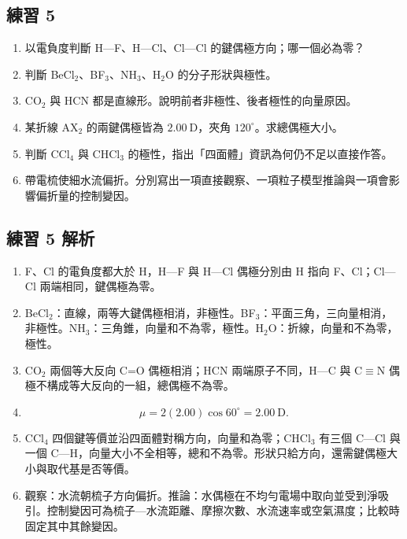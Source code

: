 \documentclass[11pt,a4paper]{article}
\providecommand{\tightlist}{%
  \setlength{\itemsep}{0pt}\setlength{\parskip}{0pt}}
\begin{document}
\subsection{練習 5}\label{ux7df4ux7fd2-5}

\begin{enumerate}
\def\labelenumi{\arabic{enumi}.}
\tightlist
\item
  以電負度判斷 H---F、H---Cl、Cl---Cl 的鍵偶極方向；哪一個必為零？
\item
  判斷 BeCl\(_2\)、BF\(_3\)、NH\(_3\)、H\(_2\)O 的分子形狀與極性。
\item
  CO\(_2\) 與 HCN 都是直線形。說明前者非極性、後者極性的向量原因。
\item
  某折線 AX\(_2\) 的兩鍵偶極皆為 \(2.00\ \mathrm D\)，夾角 \(120^\circ\)。求總偶極大小。
\item
  判斷 CCl\(_4\) 與 CHCl\(_3\) 的極性，指出「四面體」資訊為何仍不足以直接作答。
\item
  帶電梳使細水流偏折。分別寫出一項直接觀察、一項粒子模型推論與一項會影響偏折量的控制變因。
\end{enumerate}

\subsection{練習 5 解析}\label{ux7df4ux7fd2-5-ux89e3ux6790}

\begin{enumerate}
\def\labelenumi{\arabic{enumi}.}
\item
  F、Cl 的電負度都大於 H，H---F 與 H---Cl 偶極分別由 H 指向 F、Cl；Cl---Cl 兩端相同，鍵偶極為零。
\item
  BeCl\(_2\)：直線，兩等大鍵偶極相消，非極性。BF\(_3\)：平面三角，三向量相消，非極性。NH\(_3\)：三角錐，向量和不為零，極性。H\(_2\)O：折線，向量和不為零，極性。
\item
  CO\(_2\) 兩個等大反向 C=O 偶極相消；HCN 兩端原子不同，H---C 與 C\(\equiv\)N 偶極不構成等大反向的一組，總偶極不為零。
\item
  \[
  \mu=2(2.00)\cos60^\circ=2.00\ \mathrm D.
  \]
\item
  CCl\(_4\) 四個鍵等價並沿四面體對稱方向，向量和為零；CHCl\(_3\) 有三個 C---Cl 與一個 C---H，向量大小不全相等，總和不為零。形狀只給方向，還需鍵偶極大小與取代基是否等價。
\item
  觀察：水流朝梳子方向偏折。推論：水偶極在不均勻電場中取向並受到淨吸引。控制變因可為梳子---水流距離、摩擦次數、水流速率或空氣濕度；比較時固定其中其餘變因。
\end{enumerate}
\end{document}
